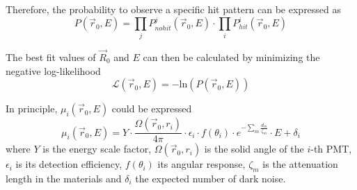 \documentclass[../main.tex]{subfiles}
\begin{document}
Therefore, the probability to observe a specific hit pattern can be expressed as
\begin{equation}
  P(\vec{r}_0, E) = \prod_j P^j_{nohit}(\vec{r}_0, E) \cdot \prod_i P^i_{hit}(\vec{r}_0, E)
\end{equation}

The best fit values of $\vec{R}_0$ and $E$ can then be calculated by minimizing the negative log-likelihood
\begin{equation}
  \label{eq:juno:rec:charge_likelihood}
  \mathcal{L}(\vec{r}_0, E) = - \mathrm{ln}(P(\vec{r}_0,E))
\end{equation}

In principle, $\mu_i(\vec{r}_0, E)$ could be expressed
\begin{equation}
  \label{eq:juno:rec:mu_i}
  \mu_i(\vec{r}_0, E) = Y \cdot \frac{\Omega(\vec{r}_0, r_i)}{4 \pi} \cdot \epsilon_i \cdot f(\theta_i) \cdot e^{-\sum_m \frac{d_m}{\zeta_m}}\cdot E + \delta_i
\end{equation}
where $Y$ is the energy scale factor, $\Omega(\vec{r}_0, r_i)$ is the solid angle of the $i$-th PMT, $\epsilon_i$ is its detection efficiency, $f(\theta_i)$ its angular response, $\zeta_m$ is the attenuation length in the materials and $\delta_i$ the expected number of dark noise.
\end{document}
